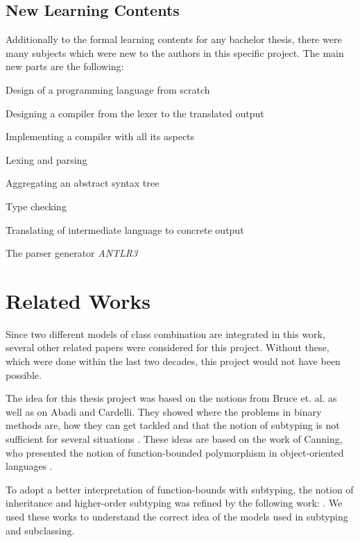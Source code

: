 \subsection{New Learning Contents}
Additionally to the formal learning contents for any bachelor thesis, there were many
subjects which were new to the authors in this specific project. The main new parts are the following:

\squishlist
	\item Design of a programming language from scratch
	\item Designing a compiler from the lexer to the translated output
	\item Implementing a compiler with all its aspects
	\squishlist
		\item Lexing and parsing
		\item Aggregating an abstract syntax tree
		\item Type checking
		\item Translating of intermediate language to concrete output
	\squishend
	\item The parser generator \emph{ANTLR3}
\squishend

\section{Related Works}
Since two different models of class combination are integrated in this
work, several other related papers were considered for this project.
Without these, which were done within the last two decades, this project would 
not have been possible.

The idea for this thesis project was based on the notions from Bruce et. al. as
well as on Abadi and Cardelli. They showed where the
problems in binary methods are, how they can get tackled
and that the notion of subtyping is not sufficient for several
situations \cite{bruce_binary_1995,abadi_subtyping_1996}. These ideas are
based on the work of Canning, who presented the notion of function-bounded
polymorphism in object-oriented languages \cite{canning_f-bounded_1989}.

To adopt a better interpretation of function-bounds
with subtyping, the notion of inheritance and
higher-order subtyping was refined by the following work:
\cite{steffen_higher-order_1994,cook_inheritance_1990,taivalsaari_notion_1996}.
We used these works to understand the correct idea of the models used
in subtyping and subclassing.

